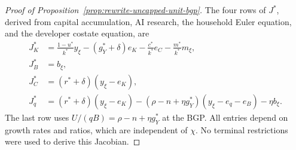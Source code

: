 \begin{proof}[Proof of Proposition~\ref{prop:rewrite-uncapped-unit-bgp}]
The four rows of $J^*$, derived from capital accumulation, AI research,
the household Euler equation, and the developer costate equation, are
\begin{align}
 J_K^*&=\frac{1-u^*}{k^*}y_\xi-(g_Y^*+\delta)e_K
 -\frac{c^*}{k^*}e_C-\frac{m^*}{k^*}m_\xi,
 \label{eq:rewrite-uncapped-unit-jacobian-k}\\
 J_B^*&=b_\xi,
 \label{eq:rewrite-uncapped-unit-jacobian-b}\\
 J_C^*&=(r^*+\delta)(y_\xi-e_K),
 \label{eq:rewrite-uncapped-unit-jacobian-c}\\
 J_q^*&=(r^*+\delta)(y_\xi-e_K)
 -(\rho-n+\eta g_Y^*)(y_\xi-e_q-e_B)-\eta b_\xi.
 \label{eq:rewrite-uncapped-unit-jacobian-q}
\end{align}
The last row uses $U/(qB)=\rho-n+\eta g_Y^*$ at the BGP.
All entries depend on growth rates and ratios, which are independent of
$\chi$. No terminal restrictions were used to derive this Jacobian.


\end{proof}
